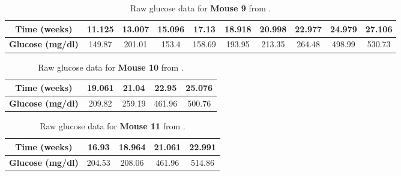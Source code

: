 \begin{appendices}
\begin{table}[H]
\centering
  \begin{center} 
    \begin{tabular} {c|c|c|c|c|c|c|c|c|c}%
    \cline{1-10}
      \textbf{Time (weeks)} & 11.125 & 13.007 & 15.096 & 17.13 & 18.918 & 20.998 & 22.977 & 24.979 & 27.106\\
      \hline
      \textbf{Glucose (mg/dl)} & 149.87 & 201.01 & 153.4 & 158.69 & 193.95 & 213.35 & 264.48 & 498.99 & 530.73\\
      \hline
    \end{tabular}
    \caption{Raw glucose data for \textbf{Mouse 9} from \cite{Lietal2009}.}
    \label{table:Li_Mouse9}
  \end{center}
\end{table}

\begin{table}[H]
\centering
  \begin{center} 
    \begin{tabular} {c|c|c|c|c}%
    \cline{1-5}
      \textbf{Time (weeks)} & 19.061 & 21.04 & 22.95 & 25.076\\
      \hline
      \textbf{Glucose (mg/dl)} & 209.82 & 259.19 & 461.96 & 500.76\\
      \hline
    \end{tabular}
    \caption{Raw glucose data for \textbf{Mouse 10} from \cite{Lietal2009}.}
    \label{table:Li_Mouse10}
  \end{center}
\end{table}

\begin{table}[H]
\centering
  \begin{center} 
    \begin{tabular} {c|c|c|c|c}%
    \cline{1-5}
      \textbf{Time (weeks)} & 16.93 & 18.964 & 21.061 & 22.991\\
      \hline
      \textbf{Glucose (mg/dl)} & 204.53 & 208.06 & 461.96 & 514.86\\
      \hline
    \end{tabular}
    \caption{Raw glucose data for \textbf{Mouse 11} from \cite{Lietal2009}.}
    \label{table:Li_Mouse11}
  \end{center}
\end{table}



\end{appendices}
